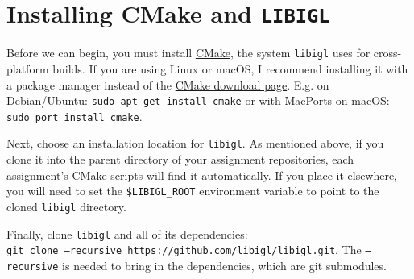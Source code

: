 \documentclass[11pt]{amsart}
\begin{document}
\section*{Installing CMake and \texttt{LIBIGL}}
Before we can begin, you must install \href{https://cmake.org/}{CMake}, the
system \texttt{libigl} uses for cross-platform builds. If you are using Linux or
macOS, I recommend installing it with a package manager instead of the
\href{https://cmake.org/download/}{CMake download page}.
E.g. on Debian/Ubuntu: \texttt{sudo apt-get install cmake} or with
\href{http://macports.org}{MacPorts} on macOS: \texttt{sudo port install cmake}.

Next, choose an installation location for \texttt{libigl}. As mentioned above,
if you clone it into the parent directory of your assignment repositories, each
assignment's CMake scripts will find it automatically. If you place it
elsewhere, you will need to set the \texttt{\$LIBIGL\_ROOT} environment variable
to point to the cloned \texttt{libigl} directory.

Finally, clone \texttt{libigl} and all of its dependencies:\\
\texttt{git clone --recursive https://github.com/libigl/libigl.git}.
The \texttt{--recursive} is needed to bring in the dependencies, which are git
submodules.
\end{document}
